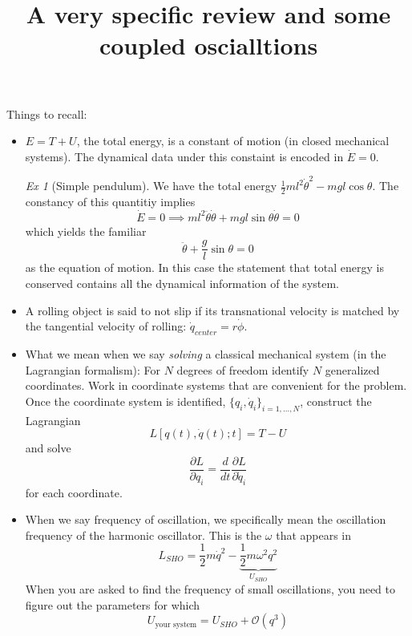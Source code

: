 \documentclass{article}
\title{A very specific review and some coupled oscialltions}
\theoremstyle{definition}
\theoremstyle{remark}
\theoremstyle{example}
\newtheorem*{example}{Ex}
\begin{document}
\maketitle

Things to recall:
\begin{itemize}
  \item $E=T+U$, the total energy, is a constant of motion (in closed mechanical systems). The dynamical data under this constaint is encoded in $\dot E=0$.
  \begin{example}[Simple pendulum] We have the total energy $\frac{1}{2}m l^2\dot \theta^2-mgl\cos\theta$. The constancy of this quantitiy implies
    $$
    \dot E =0 \implies ml^2 \ddot \theta\dot\theta+ mgl \sin \theta \dot \theta = 0
    $$
    which yields the familiar
    $$
    \ddot \theta+\frac{g}{l}\sin\theta =0
    $$
    as the equation of motion. In this case the statement that total energy is conserved contains all the dynamical information of the system.
  \end{example}
  \item A rolling object is said to not slip if its transnational velocity is matched by the tangential velocity of rolling: $\dot q_{center} = r\dot \phi$. 
  \item What we mean when we say \emph{solving} a classical mechanical system (in the Lagrangian formalism): For $N$ degrees of freedom identify $N$ generalized coordinates. Work in coordinate systems that are convenient for the problem. Once the coordinate system is identified, $\{q_i,\dot q_i\}_{i=1,...,N}$, construct the Lagrangian
  $$
  L[q(t),\dot q(t);t] = T-U
  $$
  and solve
  $$
  \frac{\partial L}{\partial q_i} = \frac{d}{dt}\frac{\partial L}{\partial \dot q_i}
  $$
  for each coordinate.
  \item When we say frequency of oscillation, we specifically mean the oscillation frequency of the harmonic oscillator. This is the $\omega$ that appears in
  $$
  L_{SHO} = \frac{1}{2}m\dot q^2-\underbrace{\frac{1}{2}m\omega^2 q^2}_{U_{SHO}}
  $$
  When you are asked to find the frequency of small oscillations, you need to figure out the parameters for which 
  $$
  U_{\text{your system}} = U_{SHO}+\mathcal O(q^3)
  $$
\end{itemize}
\end{document}
